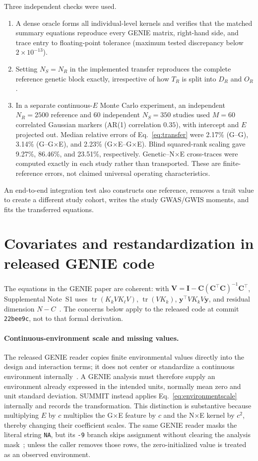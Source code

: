 \documentclass[11pt]{article}
\newcommand{\tr}{\operatorname{tr}}
\newcommand{\bI}{\bm I}
\newcommand{\by}{\bm y}
\newcommand{\bC}{\bm C}
\begin{document}
Three independent checks were used.
\begin{enumerate}
 \item A dense oracle forms all individual-level kernels and verifies that the
 matched summary equations reproduce every GENIE matrix, right-hand side, and
 trace entry to floating-point tolerance (maximum tested discrepancy below
 $2\times10^{-13}$).
 \item Setting $N_S=N_R$ in the implemented transfer reproduces the complete
 reference genetic block exactly, irrespective of how $T_R$ is split into
 $D_R$ and $O_R$.
 \item In a separate continuous-$E$ Monte Carlo experiment, an independent
 $N_R=2500$ reference and 60 independent $N_S=350$ studies used $M=60$
 correlated Gaussian markers (AR(1) correlation $0.35$), with intercept and
 $E$ projected out.  Median relative errors of Eq.~\eqref{eq:transfer} were
 2.17\% (G--G), 3.14\% (G--G$\times$E), and 2.23\%
 (G$\times$E--G$\times$E).  Blind squared-rank scaling gave 9.27\%, 86.46\%,
 and 23.51\%, respectively.  Genetic--N$\times$E cross-traces were computed
 exactly in each study rather than transported.  These are finite-reference
 errors, not claimed universal operating characteristics.
\end{enumerate}
An end-to-end integration test also constructs one reference, removes a trait
value to create a different study cohort, writes the study GWAS/GWIS moments,
and fits the transferred equations.

\section{Covariates and restandardization in released GENIE code}

The equations in the GENIE paper are coherent: with
$\bm V=\bI-\bC(\bC^\top\bC)^{-1}\bC^\top$, Supplemental Note~S1 uses
$\tr(K_kVK_\ell V)$, $\tr(VK_k)$, $\by^\top VK_kV\by$, and residual dimension
$N-C$~\cite{geniesupp}.  The concerns below apply to the released code at
commit \texttt{22bee9c}, not to that formal derivation.

\paragraph{Continuous-environment scale and missing values.}
The released GENIE reader copies finite environmental values directly into
the design and interaction terms; it does not center or standardize a
continuous environment internally~\cite{geniecodeenv}.  A GENIE analysis must
therefore supply an environment already expressed in the intended units,
normally mean zero and unit standard deviation.  SUMMIT instead applies
Eq.~\eqref{eq:environmentscale} internally and records the transformation.
This distinction is substantive because multiplying $E$ by $c$ multiplies
the G$\times$E feature by $c$ and the N$\times$E kernel by $c^2$, thereby
changing their coefficient scales.  The same GENIE reader masks the literal
string \texttt{NA}, but its \texttt{-9} branch skips assignment without
clearing the analysis mask~\cite{geniecodeenv}; unless the caller removes
those rows, the zero-initialized value is treated as an observed environment.
\end{document}
